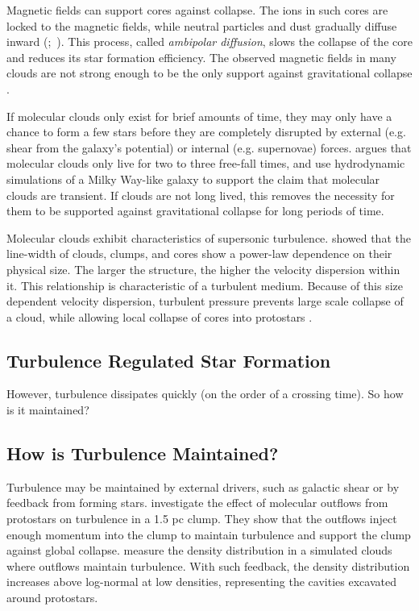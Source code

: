 Magnetic fields can support cores against collapse. The ions in such cores are locked to the magnetic fields, while neutral particles and dust gradually diffuse inward (\citet{Mestel_1956};~\citet{Shu_1983}). This process, called \textit{ambipolar diffusion}, slows the collapse of the core and reduces its star formation efficiency. The observed magnetic fields in many clouds are not strong enough to be the only support against gravitational collapse \cite{Crutcher_2012}.

If molecular clouds only exist for brief amounts of time, they may only have a chance to form a few stars before they are completely disrupted by external (e.g. shear from the galaxy's potential) or internal (e.g. supernovae) forces. \citet{Murray_2011} argues that molecular clouds only live for two to three free-fall times, and \citet{Dobbs_2013} use hydrodynamic simulations of a Milky Way-like galaxy to support the claim that molecular clouds are transient. If clouds are not long lived, this removes the necessity for them to be supported against gravitational collapse for long periods of time. 

Molecular clouds exhibit characteristics of supersonic turbulence. \citet{Larson81} showed that the line-width of clouds, clumps, and cores show a power-law dependence on their physical size. The larger the structure, the higher the velocity dispersion within it. This relationship is characteristic of a turbulent medium. Because of this size dependent velocity dispersion, turbulent pressure prevents large scale collapse of a cloud, while allowing local collapse of cores into protostars \cite{Mac_Low_2004}.

\subsection{Turbulence Regulated Star Formation}\label{sec:turb}

However, turbulence dissipates quickly (on the order of a crossing time). So how is it maintained?


\subsection{How is Turbulence Maintained?}\label{sec:turb-maint}
Turbulence may be maintained by external drivers, such as galactic shear \cite{Dobbs_2013} or by feedback from forming stars. \citet{Nakamura_2007} investigate the effect of molecular outflows from protostars on turbulence in a 1.5 pc clump. They show that the outflows inject enough momentum into the clump to maintain turbulence and support the clump against global collapse. \citet{Moraghan_2013} measure the density distribution in a simulated clouds where outflows maintain turbulence. With such feedback, the density distribution increases above log-normal at low densities, representing the cavities excavated around protostars.

